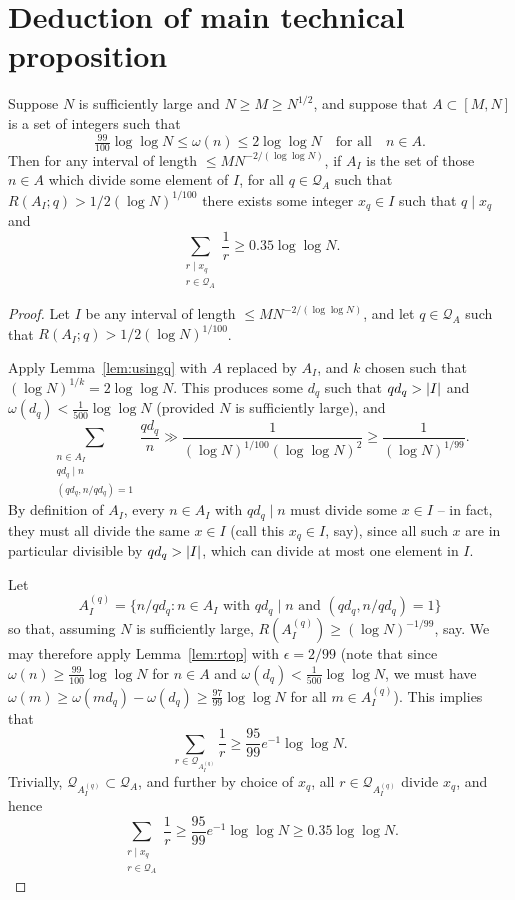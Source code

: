 \chapter{Deduction of main technical proposition}
\label{chap:techprop}


\begin{lemma}\label{lem:find_multiples}
Suppose $N$ is sufficiently large and $N\geq M\geq N^{1/2}$, and suppose that $A\subset [M,N]$ is a set of integers such that
\[\tfrac{99}{100}\log\log N\leq \omega(n)\leq  2\log\log N\quad\textrm{for all}\quad n\in A.\]
Then for any interval of length $\leq MN^{-2/(\log \log N)}$, if $A_I$ is the set of those $n\in A$ which divide some element of $I$, for all $q\in\mathcal{Q}_A$ such that $R(A_I;q)> 1/2(\log N)^{1/100}$ there exists some integer $x_q\in I$ such that $q\mid x_q$ and
\[\sum_{\substack{r\mid x_q\\ r\in \mathcal{Q}_A}}\frac{1}{r}\geq 0.35\log\log N.\]
\end{lemma}
\begin{proof}
Let $I$ be any interval of length $\leq MN^{-2/(\log\log N)}$, and let $q\in\mathcal{Q}_A$ such that $R(A_I;q)> 1/2(\log N)^{1/100}$.

Apply Lemma~\ref{lem:usingq} with $A$ replaced by $A_I$, and $k$ chosen such that $(\log N)^{1/k}=2\log\log N$. This produces some $d_q$ such that $qd_q>\left\lvert I\right\rvert$ and $\omega(d_q)<\tfrac{1}{500}\log\log N$ (provided $N$ is sufficiently large), and
  \[\sum_{\substack{n\in A_I\\ qd_q\mid n\\ (qd_q,n/qd_q)=1}}\frac{qd_q}{n}\gg \frac{1}{(\log N)^{1/100}(\log\log N)^2}\geq \frac{1}{(\log N)^{1/99}}.\]
  By definition of $A_I$, every $n\in A_I$ with $qd_q\mid n$ must divide some $x\in I$ -- in fact, they must all divide the same $x\in I$ (call this $x_q\in I$, say), since all such $x$ are in particular divisible by $qd_q>\left\lvert I\right\rvert$, which can divide at most one element in $I$.

Let
  \[A_I^{(q)}=\{ n/qd_q : n\in A_I\textrm{ with }qd_q\mid n\textrm{ and }(qd_q,n/qd_q)=1\}\]
  so that, assuming $N$ is sufficiently large, $R(A_I^{(q)})\geq (\log N)^{-1/99}$, say. We may therefore apply Lemma~\ref{lem:rtop} with $\epsilon=2/99$ (note that since $\omega(n)\geq \frac{99}{100}\log\log N$ for $n\in A$ and $\omega(d_q)<\frac{1}{500}\log\log N$, we must have $\omega(m)\geq \omega(md_q)-\omega(d_q)\geq \frac{97}{99}\log\log N$ for all $m\in A_I^{(q)}$). This implies that
  \[\sum_{r\in \mathcal{Q}_{A_I^{(q)}}}\frac{1}{r}\geq \frac{95}{99}e^{-1}\log\log N.\]
  Trivially, $\mathcal{Q}_{A_I^{(q)}}\subset \mathcal{Q}_A$, and further by choice of $x_q$, all $r\in \mathcal{Q}_{A_I^{(q)}}$ divide $x_q$, and hence
  \[\sum_{\substack{r\mid x_q\\ r\in \mathcal{Q}_A}}\frac{1}{r}\geq \frac{95}{99}e^{-1}\log\log N\geq 0.35\log\log N.\]
\end{proof}


